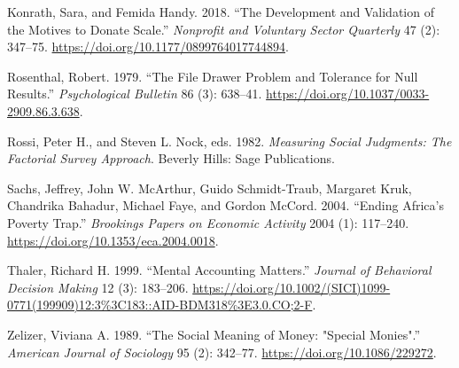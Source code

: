 \documentclass[
  12pt,
]{article}
\begin{document}
\leavevmode\hypertarget{ref-konrathDevelopmentValidationMotives2018}{}%
Konrath, Sara, and Femida Handy. 2018. ``The Development and Validation
of the Motives to Donate Scale.'' \emph{Nonprofit and Voluntary Sector
Quarterly} 47 (2): 347--75.
\url{https://doi.org/10.1177/0899764017744894}.

\leavevmode\hypertarget{ref-rosenthalFileDrawerProblem1979}{}%
Rosenthal, Robert. 1979. ``The File Drawer Problem and Tolerance for
Null Results.'' \emph{Psychological Bulletin} 86 (3): 638--41.
\url{https://doi.org/10.1037/0033-2909.86.3.638}.

\leavevmode\hypertarget{ref-rossiMeasuringSocialJudgments1982}{}%
Rossi, Peter H., and Steven L. Nock, eds. 1982. \emph{Measuring Social
Judgments: The Factorial Survey Approach}. Beverly Hills: Sage
Publications.

\leavevmode\hypertarget{ref-sachsEndingAfricaPoverty2004}{}%
Sachs, Jeffrey, John W. McArthur, Guido Schmidt-Traub, Margaret Kruk,
Chandrika Bahadur, Michael Faye, and Gordon McCord. 2004. ``Ending
Africa's Poverty Trap.'' \emph{Brookings Papers on Economic Activity}
2004 (1): 117--240. \url{https://doi.org/10.1353/eca.2004.0018}.

\leavevmode\hypertarget{ref-thalerMentalAccountingMatters1999}{}%
Thaler, Richard H. 1999. ``Mental Accounting Matters.'' \emph{Journal of
Behavioral Decision Making} 12 (3): 183--206.
\url{https://doi.org/10.1002/(SICI)1099-0771(199909)12:3\%3C183::AID-BDM318\%3E3.0.CO;2-F}.

\leavevmode\hypertarget{ref-zelizerSocialMeaningMoney1989}{}%
Zelizer, Viviana A. 1989. ``The Social Meaning of Money: "Special
Monies".'' \emph{American Journal of Sociology} 95 (2): 342--77.
\url{https://doi.org/10.1086/229272}.
\end{document}
